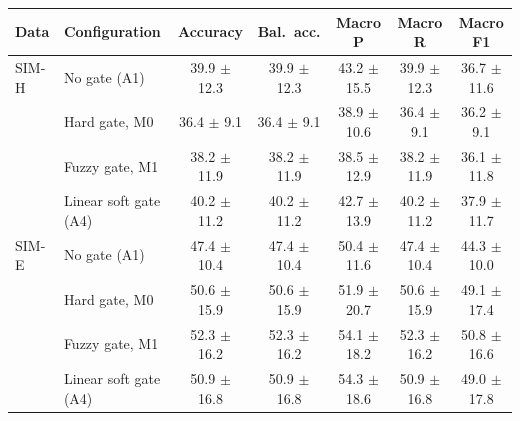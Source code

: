 \begin{tabular}{@{}llccccc@{}}
\toprule
Data & Configuration & Accuracy & Bal.\ acc. & Macro P & Macro R & Macro F1\\
\midrule
SIM-H & No gate (A1) & 39.9 $\pm$ 12.3 & 39.9 $\pm$ 12.3 & 43.2 $\pm$ 15.5 & 39.9 $\pm$ 12.3 & 36.7 $\pm$ 11.6\\
 & Hard gate, M0 & 36.4 $\pm$ 9.1 & 36.4 $\pm$ 9.1 & 38.9 $\pm$ 10.6 & 36.4 $\pm$ 9.1 & 36.2 $\pm$ 9.1\\
 & Fuzzy gate, M1 & 38.2 $\pm$ 11.9 & 38.2 $\pm$ 11.9 & 38.5 $\pm$ 12.9 & 38.2 $\pm$ 11.9 & 36.1 $\pm$ 11.8\\
 & Linear soft gate (A4) & 40.2 $\pm$ 11.2 & 40.2 $\pm$ 11.2 & 42.7 $\pm$ 13.9 & 40.2 $\pm$ 11.2 & 37.9 $\pm$ 11.7\\
\midrule
SIM-E & No gate (A1) & 47.4 $\pm$ 10.4 & 47.4 $\pm$ 10.4 & 50.4 $\pm$ 11.6 & 47.4 $\pm$ 10.4 & 44.3 $\pm$ 10.0\\
 & Hard gate, M0 & 50.6 $\pm$ 15.9 & 50.6 $\pm$ 15.9 & 51.9 $\pm$ 20.7 & 50.6 $\pm$ 15.9 & 49.1 $\pm$ 17.4\\
 & Fuzzy gate, M1 & 52.3 $\pm$ 16.2 & 52.3 $\pm$ 16.2 & 54.1 $\pm$ 18.2 & 52.3 $\pm$ 16.2 & 50.8 $\pm$ 16.6\\
 & Linear soft gate (A4) & 50.9 $\pm$ 16.8 & 50.9 $\pm$ 16.8 & 54.3 $\pm$ 18.6 & 50.9 $\pm$ 16.8 & 49.0 $\pm$ 17.8\\
\bottomrule
\end{tabular}
